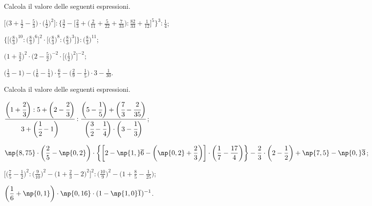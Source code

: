 \begin{esercizio}[\Ast]%
 Calcola il valore delle seguenti espressioni.
\begin{enumeratea}
\spazielenx
\item $\displaystyle{\bigg[\bigg(3+\frac{1}{2}-\frac{5}{3}\bigg)\cdot
\bigg(\frac{1}{2}\bigg)^{2}\bigg]:\bigg\{\frac{3}{2}-\bigg[\frac{2}{3}+\bigg(\frac{2}{11}+
\frac{5}{22}+\frac{7}{33}\bigg):\frac{82}{33}+\frac{1}{12}\bigg]^{5}\bigg\}^{3}:\frac{1}{4}}$;
\item $\displaystyle{\bigg\{\bigg[\bigg(\frac{8}{3}\bigg)^{10}:\bigg(\frac{8}{3}\bigg)^{6}\bigg]^{2}\cdot
\bigg[\bigg(\frac{8}{3}\bigg)^{8}:\bigg(\frac{8}{3}\bigg)^{3}\bigg]\bigg\}:\bigg(\frac{8}{3}\bigg)^{11}}$;
\item $\displaystyle{\bigg(1+\frac{3}{2}\bigg)^{2}\cdot
\bigg(2-\frac{5}{2}\bigg)^{-2}\cdot
\bigg[\bigg(\frac{1}{2}\bigg)^{2}\bigg]^{-2}}$;
\item $\displaystyle{\bigg(\frac{1}{3}-1\bigg)-\bigg(\frac{1}{6}-\frac{1}{4}\bigg)\cdot
{\frac{6}{5}}-\bigg(\frac{2}{9}-\frac{1}{5}\bigg)\cdot 3-\frac{1}{30}}$.
\end{enumeratea}
\end{esercizio}

\begin{esercizio}[\Ast]%
 Calcola il valore delle seguenti espressioni.
\begin{enumeratea}
\spazielenx
\item $\displaystyle{\cfrac{\bigg(1+\cfrac{2}{3}\bigg):5+\bigg(2-\cfrac{2}{3}\bigg)}{3+\bigg(\cfrac{1}{2}-1\bigg)}:
\frac{\bigg(5-\cfrac{1}{5}\bigg)+\bigg(\cfrac{7}{3}-\cfrac{2}{35}\bigg)}{\bigg(\cfrac{3}{2}-\cfrac{1}{4}\bigg)\cdot
\bigg(3-\cfrac{1}{3}\bigg)}}$;
\item $\displaystyle{\np{8,75}\cdot\bigg(\frac{2}{5}-\np{0,2}\bigg)\cdot\bigg\{\bigg[2-\np{1,}\overline{{6}}-\bigg(\np{0,2}+\frac{2}{3}\bigg)\bigg]
\cdot\bigg(\frac{1}{7}-\frac{17}{4}\bigg)\bigg\}-\frac{2}{3}\cdot\bigg(2-\frac{1}{2}\bigg)+\np{7,5}-\np{0,}\overline{{3}}}$;
\item $\displaystyle{\bigg[\bigg(\frac{7}{5}-\frac{1}{2}\bigg)^{2}:\bigg(\frac{9}{10}\bigg)^{2}-
\bigg(1+\frac{2}{3}-2\bigg)^{2}\bigg]^{2}:\bigg(\frac{10}{9}\bigg)^{2}-\bigg(1+\frac{8}{5}-\frac{1}{25}\bigg)}$;
\item $\displaystyle{\bigg(\frac{1}{6}+\np{0,1}\bigg)\cdot \np{0,16}\cdot
(1-\np{1,0}\overline{{1}})^{-1}}$.
\end{enumeratea}
\end{esercizio}

